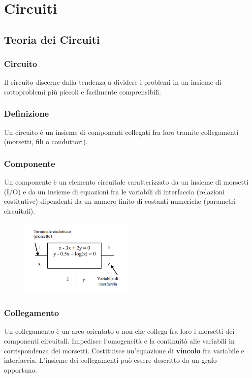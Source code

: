 \chapter{Circuiti}

\section{Teoria dei Circuiti}  

\subsection*{Circuito}
Il circuito discerne dalla tendenza a dividere i problemi in un insieme di sottoproblemi più piccoli e facilmente comprensibili.

\subsection*{Definizione}
Un circuito è un insieme di componenti collegati fra loro tramite collegamenti (morsetti, fili o conduttori).

\subsection*{Componente}
Un componente è un elemento circuitale caratterizzato da un insieme di morsetti (I/O) e da un insieme di equazioni fra le variabili di interfaccia (relazioni costitutive) dipendenti da un numero finito di costanti numeriche (parametri circuitali).
\begin{figure}[H]
    \centering
    \includegraphics[width=0.5\textwidth]{capitoli/capitolo1/immagini/image1.png}
\end{figure}


\subsection*{Collegamento}
Un collegamento è un arco orientato o non che collega fra loro i morsetti dei componenti circuitali. 
Impedisce l'omogeneità e la continuità alle variabili in corrispondenza dei morsetti. 
Costituisce un'equazione di \textbf{vincolo} fra variabile e interfaccia.
L'insieme dei collegamenti può essere descritto da un grafo opportuno.

